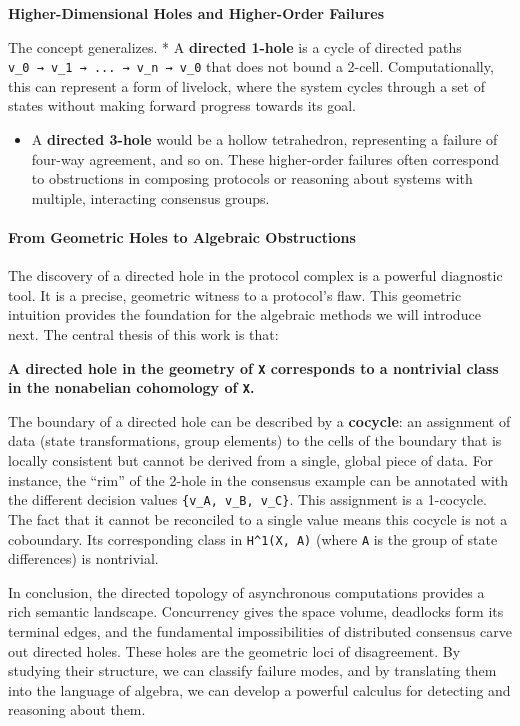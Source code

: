 \documentclass[
]{article}
\providecommand{\tightlist}{%
  \setlength{\itemsep}{0pt}\setlength{\parskip}{0pt}}
\begin{document}
\textbf{Higher-Dimensional Holes and Higher-Order Failures}

The concept generalizes. * A \textbf{directed 1-hole} is a cycle of
directed paths \texttt{v\_0\ →\ v\_1\ →\ ...\ →\ v\_n\ →\ v\_0} that
does not bound a 2-cell. Computationally, this can represent a form of
livelock, where the system cycles through a set of states without making
forward progress towards its goal.

\begin{itemize}
\tightlist
\item
  A \textbf{directed 3-hole} would be a hollow tetrahedron, representing
  a failure of four-way agreement, and so on. These higher-order
  failures often correspond to obstructions in composing protocols or
  reasoning about systems with multiple, interacting consensus groups.
\end{itemize}

\paragraph{From Geometric Holes to Algebraic
Obstructions}\label{from-geometric-holes-to-algebraic-obstructions}

The discovery of a directed hole in the protocol complex is a powerful
diagnostic tool. It is a precise, geometric witness to a protocol's
flaw. This geometric intuition provides the foundation for the algebraic
methods we will introduce next. The central thesis of this work is that:

\textbf{A directed hole in the geometry of \texttt{X} corresponds to a
nontrivial class in the nonabelian cohomology of \texttt{X}.}

The boundary of a directed hole can be described by a \textbf{cocycle}:
an assignment of data (state transformations, group elements) to the
cells of the boundary that is locally consistent but cannot be derived
from a single, global piece of data. For instance, the ``rim'' of the
2-hole in the consensus example can be annotated with the different
decision values \texttt{\{v\_A,\ v\_B,\ v\_C\}}. This assignment is a
1-cocycle. The fact that it cannot be reconciled to a single value means
this cocycle is not a coboundary. Its corresponding class in
\texttt{H\^{}1(X,\ A)} (where \texttt{A} is the group of state
differences) is nontrivial.

In conclusion, the directed topology of asynchronous computations
provides a rich semantic landscape. Concurrency gives the space volume,
deadlocks form its terminal edges, and the fundamental impossibilities
of distributed consensus carve out directed holes. These holes are the
geometric loci of disagreement. By studying their structure, we can
classify failure modes, and by translating them into the language of
algebra, we can develop a powerful calculus for detecting and reasoning
about them.
\end{document}
